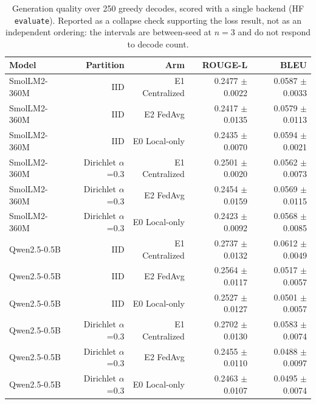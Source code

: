 \begin{table}[t]
\centering
\small
\caption{Generation quality over 250 greedy decodes, scored with a single backend (HF \texttt{evaluate}). Reported as a collapse check supporting the loss result, not as an independent ordering: the intervals are between-seed at $n=3$ and do not respond to decode count.}
\label{tab:gen}
\begin{tabular}{lrrrr}
\toprule
\textbf{Model} & \textbf{Partition} & \textbf{Arm} & \textbf{ROUGE-L} & \textbf{BLEU} \\
\midrule
SmolLM2-360M & IID & E1 Centralized & 0.2477 $\pm$ 0.0022 & 0.0587 $\pm$ 0.0033 \\
SmolLM2-360M & IID & E2 FedAvg & 0.2417 $\pm$ 0.0135 & 0.0579 $\pm$ 0.0113 \\
SmolLM2-360M & IID & E0 Local-only & 0.2435 $\pm$ 0.0070 & 0.0594 $\pm$ 0.0021 \\
SmolLM2-360M & Dirichlet $\alpha$=0.3 & E1 Centralized & 0.2501 $\pm$ 0.0020 & 0.0562 $\pm$ 0.0073 \\
SmolLM2-360M & Dirichlet $\alpha$=0.3 & E2 FedAvg & 0.2454 $\pm$ 0.0159 & 0.0569 $\pm$ 0.0115 \\
SmolLM2-360M & Dirichlet $\alpha$=0.3 & E0 Local-only & 0.2423 $\pm$ 0.0092 & 0.0568 $\pm$ 0.0085 \\
Qwen2.5-0.5B & IID & E1 Centralized & 0.2737 $\pm$ 0.0132 & 0.0612 $\pm$ 0.0049 \\
Qwen2.5-0.5B & IID & E2 FedAvg & 0.2564 $\pm$ 0.0117 & 0.0517 $\pm$ 0.0057 \\
Qwen2.5-0.5B & IID & E0 Local-only & 0.2527 $\pm$ 0.0127 & 0.0501 $\pm$ 0.0057 \\
Qwen2.5-0.5B & Dirichlet $\alpha$=0.3 & E1 Centralized & 0.2702 $\pm$ 0.0130 & 0.0583 $\pm$ 0.0074 \\
Qwen2.5-0.5B & Dirichlet $\alpha$=0.3 & E2 FedAvg & 0.2455 $\pm$ 0.0110 & 0.0488 $\pm$ 0.0097 \\
Qwen2.5-0.5B & Dirichlet $\alpha$=0.3 & E0 Local-only & 0.2463 $\pm$ 0.0107 & 0.0495 $\pm$ 0.0074 \\
\bottomrule
\end{tabular}
\end{table}
